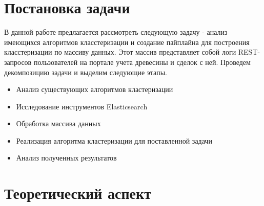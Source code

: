 \documentclass[a4paper]{article}
\begin{document}
\newpage
\section{Постановка задачи}
В данной работе предлагается рассмотреть следующую задачу - анализ имеющихся алгоритмов класстеризации и создание пайплайна для построения класстеризации по массиву данных. Этот массив представляет собой логи REST-запросов пользователей на портале учета древесины и сделок с ней. Проведем декомпозицию задачи и выделим следующие этапы.
\begin{itemize}
  \item Анализ существующих алгоритмов кластеризации
  \item Исследование инструментов Elasticsearch
  \item Обработка массива данных
  \item Реализация алгоритма кластеризации для поставленной задачи
  \item Анализ полученных результатов
\end{itemize}

\newpage
\section{Теоретический аспект}
\end{document}
